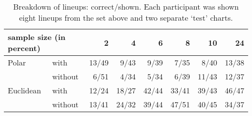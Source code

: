 \begin{table}[hbtp]
\resizebox{\linewidth}{!} {
	\begin{tabular}{ll|@{}r|@{}r|@{}r|@{}r|@{}r|@{}r}
	\multicolumn{2}{l}{sample size (in percent)}  & 2 & 4 & 6 & 8 & 10 & 24 \\ [1pt] \hline
	Polar & with & 13/49& 9/43 & 9/39 & 7/35 & 8/40 & 13/38 \\
	& without & 6/51&   4/34 &  5/34 &  6/39 & 11/43 &  12/37\\ [1pt] \hline
	Euclidean & with &12/24& 18/27 & 42/44 & 33/41 & 39/43 & 46/47\\
	& without & 13/41 &24/32& 39/44 & 47/51 & 40/45 & 34/37\\
	\end{tabular}
	}
\caption{\label{tbl:treatment} Breakdown of lineups: correct/shown. Each participant was shown eight lineups from the set above and two separate `test' charts.}
\end{table}




